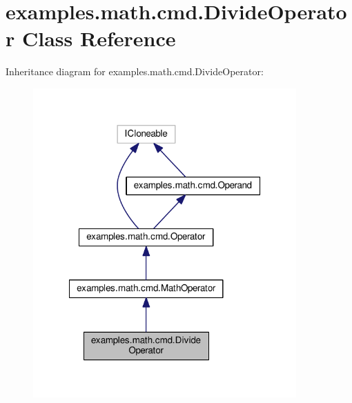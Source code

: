 \hypertarget{classexamples_1_1math_1_1cmd_1_1_divide_operator}{\section{examples.\-math.\-cmd.\-Divide\-Operator Class Reference}
\label{classexamples_1_1math_1_1cmd_1_1_divide_operator}
}


Inheritance diagram for examples.\-math.\-cmd.\-Divide\-Operator\-:
\nopagebreak
\begin{figure}[H]
\begin{center}
\leavevmode
\includegraphics[width=286pt]{classexamples_1_1math_1_1cmd_1_1_divide_operator__inherit__graph}
\end{center}
\end{figure}


